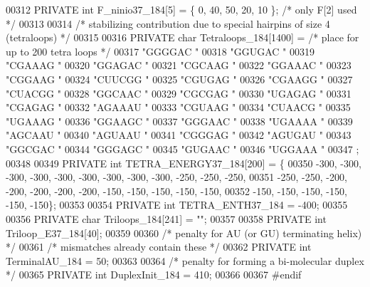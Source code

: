 \begin{DoxyCode}
00312 PRIVATE \textcolor{keywordtype}{int} F\_ninio37\_184[5] = \{ 0, 40, 50, 20, 10 \};      \textcolor{comment}{/* only F[2] used */}
00313 
00314 \textcolor{comment}{/* stabilizing contribution due to special hairpins of size 4 (tetraloops) */}
00315 
00316 PRIVATE \textcolor{keywordtype}{char} Tetraloops\_184[1400] =  \textcolor{comment}{/* place for up to 200 tetra loops */}
00317   \textcolor{stringliteral}{"GGGGAC "}
00318   \textcolor{stringliteral}{"GGUGAC "}
00319   \textcolor{stringliteral}{"CGAAAG "}
00320   \textcolor{stringliteral}{"GGAGAC "}
00321   \textcolor{stringliteral}{"CGCAAG "}
00322   \textcolor{stringliteral}{"GGAAAC "}
00323   \textcolor{stringliteral}{"CGGAAG "}
00324   \textcolor{stringliteral}{"CUUCGG "}
00325   \textcolor{stringliteral}{"CGUGAG "}
00326   \textcolor{stringliteral}{"CGAAGG "}
00327   \textcolor{stringliteral}{"CUACGG "}
00328   \textcolor{stringliteral}{"GGCAAC "}
00329   \textcolor{stringliteral}{"CGCGAG "}
00330   \textcolor{stringliteral}{"UGAGAG "}
00331   \textcolor{stringliteral}{"CGAGAG "}
00332   \textcolor{stringliteral}{"AGAAAU "}
00333   \textcolor{stringliteral}{"CGUAAG "}
00334   \textcolor{stringliteral}{"CUAACG "}
00335   \textcolor{stringliteral}{"UGAAAG "}
00336   \textcolor{stringliteral}{"GGAAGC "}
00337   \textcolor{stringliteral}{"GGGAAC "}
00338   \textcolor{stringliteral}{"UGAAAA "}
00339   \textcolor{stringliteral}{"AGCAAU "}
00340   \textcolor{stringliteral}{"AGUAAU "}
00341   \textcolor{stringliteral}{"CGGGAG "}
00342   \textcolor{stringliteral}{"AGUGAU "}
00343   \textcolor{stringliteral}{"GGCGAC "}
00344   \textcolor{stringliteral}{"GGGAGC "}
00345   \textcolor{stringliteral}{"GUGAAC "}
00346   \textcolor{stringliteral}{"UGGAAA "}
00347 ;
00348 
00349 PRIVATE \textcolor{keywordtype}{int}   TETRA\_ENERGY37\_184[200] = \{
00350   -300, -300, -300, -300, -300, -300, -300, -300, -300, -250, -250, -250,
00351   -250, -250, -200, -200, -200, -200, -200, -150, -150, -150, -150, -150,
00352   -150, -150, -150, -150, -150, -150\};
00353 
00354 PRIVATE \textcolor{keywordtype}{int}   TETRA\_ENTH37\_184   = -400;
00355 
00356 PRIVATE \textcolor{keywordtype}{char} Triloops\_184[241] = \textcolor{stringliteral}{""};
00357 
00358 PRIVATE \textcolor{keywordtype}{int} Triloop\_E37\_184[40];
00359 
00360 \textcolor{comment}{/* penalty for AU (or GU) terminating helix) */}
00361 \textcolor{comment}{/* mismatches already contain these */}
00362 PRIVATE \textcolor{keywordtype}{int} TerminalAU\_184 = 50;
00363 
00364 \textcolor{comment}{/* penalty for forming a bi-molecular duplex */}
00365 PRIVATE \textcolor{keywordtype}{int} DuplexInit\_184 = 410;
00366 
00367 \textcolor{preprocessor}{#endif}
\end{DoxyCode}
